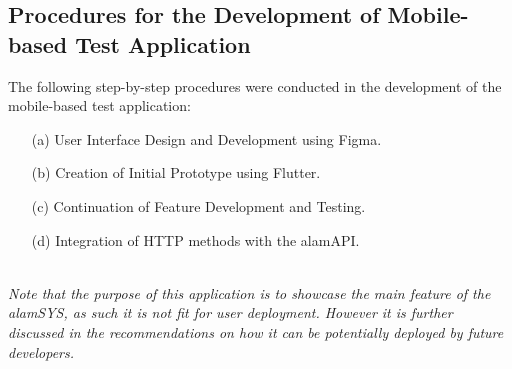 \subsection{Procedures for the Development of Mobile-based Test Application}
\label{subsec:proc_mobdev}
The following step-by-step procedures were conducted in the development
of the mobile-based test application:
\begin{itemize}
    \item[(a)] User Interface Design and Development using Figma.
    \item[(b)] Creation of Initial Prototype using Flutter.
    \item[(c)] Continuation of Feature Development and Testing.
    \item[(d)] Integration of HTTP methods with the alamAPI.
\end{itemize}
\hfill \\
\textit{Note that the purpose of this application is to showcase the main feature of
the alamSYS, as such it is not fit for user deployment. However it is further discussed
in the recommendations on how it can be potentially deployed by future developers.}

